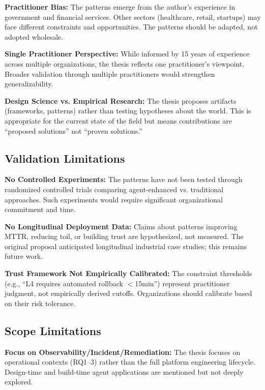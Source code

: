 \textbf{Practitioner Bias:}
The patterns emerge from the author's experience in government and financial services. Other sectors (healthcare, retail, startups) may face different constraints and opportunities. The patterns should be adapted, not adopted wholesale.

\textbf{Single Practitioner Perspective:}
While informed by 15 years of experience across multiple organizations, the thesis reflects one practitioner's viewpoint. Broader validation through multiple practitioners would strengthen generalizability.

\textbf{Design Science vs. Empirical Research:}
The thesis proposes artifacts (frameworks, patterns) rather than testing hypotheses about the world. This is appropriate for the current state of the field but means contributions are ``proposed solutions'' not ``proven solutions.''

\subsection{Validation Limitations}
\label{subsec:validation-limitations}

\textbf{No Controlled Experiments:}
The patterns have not been tested through randomized controlled trials comparing agent-enhanced vs. traditional approaches. Such experiments would require significant organizational commitment and time.

\textbf{No Longitudinal Deployment Data:}
Claims about patterns improving MTTR, reducing toil, or building trust are hypothesized, not measured. The original proposal anticipated longitudinal industrial case studies; this remains future work.

\textbf{Trust Framework Not Empirically Calibrated:}
The constraint thresholds (e.g., ``L4 requires automated rollback $<$15min'') represent practitioner judgment, not empirically derived cutoffs. Organizations should calibrate based on their risk tolerance.

\subsection{Scope Limitations}
\label{subsec:scope-limitations}

\textbf{Focus on Observability/Incident/Remediation:}
The thesis focuses on operational contexts (RQ1--3) rather than the full platform engineering lifecycle. Design-time and build-time agent applications are mentioned but not deeply explored.

